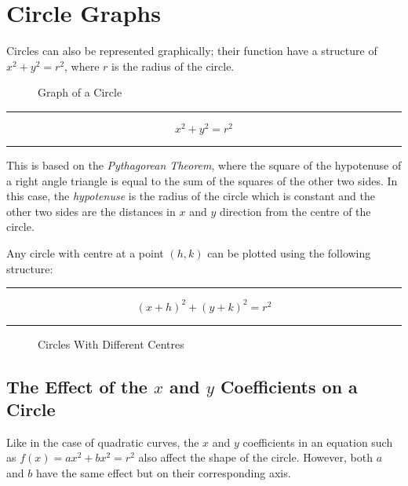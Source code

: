 \documentclass[a5paper,9pt]{book}
\theoremstyle{definition}
\newcommand{\txtlinesur}[1]{%
    \vspace*{\baselineskip}

    \hrule%

    \vspace*{\medskipamount}

    #1

    \vspace*{\medskipamount}

    \hrule%

    \vspace*{\baselineskip}
}
\begin{document}
        \pagebreak

        \section{Circle Graphs}%
        \label{sec:graphs_of_circles}

        Circles can also be represented graphically; their function have a structure of
        $x^2+y^2=r^2$, where $r$ is the radius of the circle.

        \begin{figure}[ht!]
            \centering
            
            \caption{Graph of a Circle}\label{fig:graph_of_circle}
        \end{figure}

        \txtlinesur{%
            \begin{equation}
                x^2 + y^2 = r^2
            \end{equation}
        }

        This is based on the \emph{Pythagorean Theorem}, where the square of the hypotenuse
        of a right angle triangle is equal to the sum of the squares of the other two sides. In this
        case, the \emph{hypotenuse} is the radius of the circle which is constant and
        the other two sides are the distances in $x$ and $y$ direction from the centre
        of the circle.

        Any circle with centre at a point $(h,k)$ can be plotted using the following structure:

        \txtlinesur{%
            \begin{equation}
                {(x+h)}^2 + {(y+k)}^2 = r^2
            \end{equation}
        }

        \begin{figure}[ht]
            \centering
            
            \caption{Circles With Different Centres}\label{fig:circles_with_different_centres}
        \end{figure}

        \subsection{The Effect of the $x$ and $y$ Coefficients on a Circle}

        Like in the case of quadratic curves, the $x$ and $y$ coefficients in an equation such as
        $f(x)=ax^{2}+bx^{2}=r^{2}$ also affect the shape of the circle. However, both $a$ and $b$
        have the same effect but on their corresponding axis.
\end{document}
